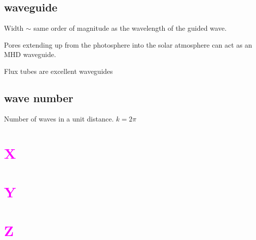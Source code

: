 \documentclass[12pt]{article}
\begin{document}
\subsection*{waveguide}
\begin{itemize*}
    \item Width $\sim$ same order of magnitude as the wavelength of
        the guided wave.
    \item Pores extending up from the photosphere
        into the solar atmosphere can act as an
        MHD waveguide.
    \item Flux tubes are excellent waveguides
\end{itemize*}

\subsection*{wave number}
Number of waves in a unit distance.
$ k = 2\pi $

\section*{\textcolor{magenta}{X}}
\section*{\textcolor{magenta}{Y}}
\section*{\textcolor{magenta}{Z}}
\end{document}
